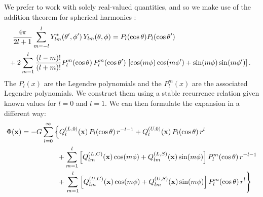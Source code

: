 \documentclass[12pt]{article}
\begin{document}
We prefer to work with solely real-valued quantities, and so we make use of the addition theorem for spherical harmonics \citep[Section 3.6]{jackson}:
\begin{align}
  \frac{4\pi}{2l+1} \sum_{m=-l}^{l} Y^*_{lm}(\theta^\prime,\phi^\prime)\, Y_{lm}(\theta, \phi) &= P_l(\text{cos}\, \theta) P_l(\text{cos}\, \theta^\prime) \notag \\
   &\hspace{-2.0in}+ 2 \sum_{m=1}^{l} \frac{(l-m)!}{(l+m)!} P_{l}^{m}(\text{cos}\, \theta)\, P_{l}^{m}(\text{cos}\, \theta^\prime)\, \left[\text{cos}(m\phi)\, \text{cos}(m\phi^\prime) + \text{sin}(m\phi)\, \text{sin}(m\phi^\prime)\right].
 \end{align}
The $P_l(x)$ are the Legendre polynomials and the $P_l^m(x)$ are the associated Legendre polynomials. We construct them using a stable recurrence relation given known values for $l = 0$ and $l = 1$. We can then formulate the expansion in a different way:
\begin{align}
  \Phi(\mathbf{x}) &= -G\sum_{l=0}^{\infty} \left\{ Q_{l}^{(L,0)}(\mathbf{x})\, P_l(\text{cos}\, \theta)\, r^{-l-1} + Q_{l}^{(U,0)}(\mathbf{x})\, P_l(\text{cos}\, \theta)\, r^{l} \right. \notag \\
  &\hspace{0.7in} + \sum_{m=1}^{l} \left[ Q_{lm}^{(L,C)}(\mathbf{x})\, \text{cos}(m\phi) + Q_{lm}^{(L,S)}(\mathbf{x})\, \text{sin}(m\phi)\right] P_{l}^{m}(\text{cos}\, \theta)\, r^{-l-1} \notag \\
  &\hspace{0.7in} + \left. \sum_{m=1}^{l} \left[ Q_{lm}^{(U,C)}(\mathbf{x})\, \text{cos}(m\phi) + Q_{lm}^{(U,S)}(\mathbf{x})\, \text{sin}(m\phi)\right] P_{l}^{m}(\text{cos}\, \theta)\, r^{l} \right\}
\end{align}
\end{document}
